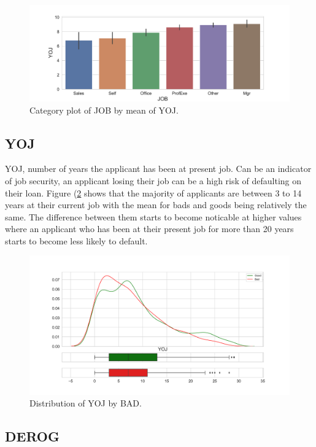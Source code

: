 \begin{figure}[!ht]
	\centering
	\includegraphics[scale=0.40]{figs/job_yoj_cat.pdf}
	\caption{Category plot of JOB by mean of YOJ. \label{job_yoj_cat}}
\end{figure}

\subsection*{YOJ}

YOJ, number of years the applicant has been at present job. Can be an indicator of job security, an applicant losing their job can be a high risk of defaulting on their loan. Figure (\ref{yoj_dist} shows that the majority of applicants are between 3 to 14 years at their current job with the mean for bads and goods being relatively the same. The difference between them starts to become noticable at higher values where an applicant who has been at their present job for more than 20 years starts to become less likely to default.

\begin{figure}[!ht]
	\centering
	\includegraphics[scale=0.40]{figs/yoj_dist.pdf}
	\caption{Distribution of YOJ by BAD. \label{yoj_dist}}
\end{figure}

\subsection*{DEROG}

